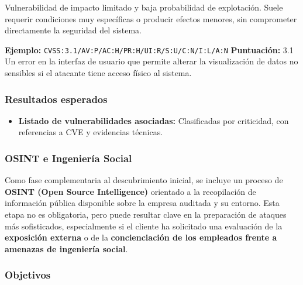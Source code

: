 \documentclass[a4paper, 11pt]{article}
\begin{document}
\vspace{0.2cm}

\begin{tcolorbox}[colback=cvsslow!10, colframe=cvsslow!80!black, coltitle=white,
title=Baja (CVSS 0.1 -- 3.9)]
Vulnerabilidad de impacto limitado y baja probabilidad de explotación. Suele requerir condiciones muy específicas o producir efectos menores, sin comprometer directamente la seguridad del sistema.

\textbf{Ejemplo:}
\texttt{CVSS:3.1/AV:P/AC:H/PR:H/UI:R/S:U/C:N/I:L/A:N}
\textbf{Puntuación:} 3.1
Un error en la interfaz de usuario que permite alterar la visualización de datos no sensibles si el atacante tiene acceso físico al sistema.
\end{tcolorbox}

\vspace{0.3cm}

\subsubsection*{Resultados esperados}

\begin{itemize}
    \item \textbf{Listado de vulnerabilidades asociadas:} Clasificadas por criticidad, con referencias a CVE y evidencias técnicas.
    
\end{itemize}










\subsubsection{OSINT e Ingeniería Social}

Como fase complementaria al descubrimiento inicial, se incluye un proceso de \textbf{OSINT (Open Source Intelligence)} orientado a la recopilación de información pública disponible sobre la empresa auditada y su entorno. Esta etapa no es obligatoria, pero puede resultar clave en la preparación de ataques más sofisticados, especialmente si el cliente ha solicitado una evaluación de la \textbf{exposición externa} o de la \textbf{concienciación de los empleados frente a amenazas de ingeniería social}.


\subsubsection*{Objetivos}
\end{document}
